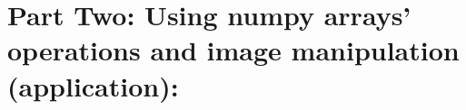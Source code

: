 \documentclass[11pt]{article}
\providecommand{\tightlist}{%
      \setlength{\itemsep}{0pt}\setlength{\parskip}{0pt}}
\newenvironment{Shaded}{}{}
\newcommand{\DecValTok}[1]{\textcolor[rgb]{0.25,0.63,0.44}{{#1}}}
\newcommand{\NormalTok}[1]{{#1}}
\newcommand{\OperatorTok}[1]{\textcolor[rgb]{0.40,0.40,0.40}{{#1}}}
\newcommand{\BuiltInTok}[1]{{#1}}
\begin{document}


\newpage
    \hypertarget{part-two-using-numpy-arrays-operations-and-image-manipulation-application}{%
\section*{\center Part Two: Using numpy arrays' operations and image
manipulation
(application):}\label{part-two-using-numpy-arrays-operations-and-image-manipulation-application}}
\end{document}
